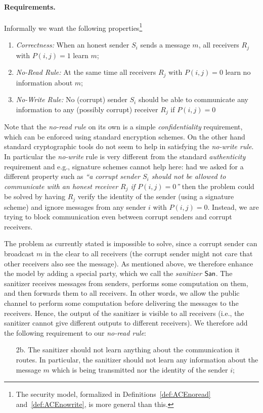 \documentclass{llncs}
\begin{document}
\paragraph{Requirements.} Informally we want the following properties\footnote{The security model, formalized in Definitions~\ref{def:ACEnoread} and~\ref{def:ACEnowrite}, is more general than this.} 
\begin{enumerate}
\item \emph{Correctness:} When an honest sender $S_i$ sends a message $m$, all receivers $R_j$ with $P(i,j)=1$ learn $m$;
\item \emph{No-Read Rule:} At the same time all receivers $R_j$ with $P(i,j)=0$ learn no information about $m$;
\item \emph{No-Write Rule:} No (corrupt) sender $S_i$ should be able to communicate any information to any (possibly corrupt) receiver $R_j$ if $P(i,j)=0$
\end{enumerate}

Note that the \emph{no-read rule} on its own is a simple \emph{confidentiality} requirement, which can be enforced using standard encryption schemes. On the other hand standard cryptographic tools do not seem to help in satisfying the \emph{no-write rule}.
In particular the \emph{no-write} rule is very different from the standard \emph{authenticity} requirement and e.g., signature schemes cannot help here: had we asked for a different property such as \emph{``a corrupt sender $S_i$ should not be allowed to communicate with an honest receiver $R_j$ if $P(i,j)=0$''} then the problem could be solved by having $R_j$ verify the identity of the sender (using a signature scheme) and ignore messages from any sender $i$ with $P(i,j)=0$. Instead, we are trying to block communication even between corrupt senders and corrupt receivers. 

The problem as currently stated is impossible to solve, since a corrupt sender can broadcast $m$ in the clear to all receivers (the corrupt sender might not care that other receivers also see the message). As mentioned above, we therefore enhance the model by adding a special party, which we call the \emph{sanitizer} $\mathsf{San}$. The sanitizer receives messages from senders, performs some computation on them, and then forwards them to all receivers. 
In other words, we allow the public channel to perform some computation before delivering the messages to the receivers. Hence, the output of the sanitizer is visible to all receivers (i.e., the sanitizer cannot give different outputs to different receivers). 
We therefore add the following requirement to our \emph{no-read rule}:
\begin{enumerate}
\item[2b.] The sanitizer should not learn anything about the communication it routes. In particular, the sanitizer should not learn any information about the message $m$ which is being transmitted nor the identity of the sender $i$; 
\end{enumerate}
\end{document}
